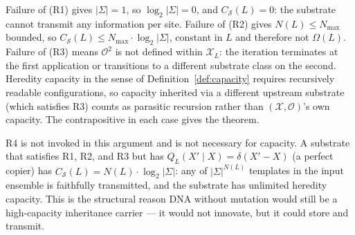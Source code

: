 \documentclass[aps,prx,reprint,amsmath,amssymb,floatfix,superscriptaddress,nofootinbib]{revtex4-2}
\theoremstyle{plain-thm}
\theoremstyle{definition-thm}
\newcommand{\Csub}{C_{\mathcal{S}}}
\newcommand{\Xset}{\mathcal{X}}
\newcommand{\Op}{\mathcal{O}}
\begin{document}
Failure of (R1) gives $|\Sigma| = 1$, so $\log_2 |\Sigma| = 0$, and $\Csub(L) = 0$: the substrate cannot transmit any information per site. Failure of (R2) gives $N(L) \le N_{\max}$ bounded, so $\Csub(L) \le N_{\max} \cdot \log_2 |\Sigma|$, constant in $L$ and therefore not $\Omega(L)$. Failure of (R3) means $\Op^2$ is not defined within $\Xset_L$: the iteration terminates at the first application or transitions to a different substrate class on the second. Heredity capacity in the sense of Definition~\ref{def:capacity} requires recursively readable configurations, so capacity inherited via a different upstream substrate (which satisfies R3) counts as parasitic recursion rather than $(\Xset, \Op)$'s own capacity. The contrapositive in each case gives the theorem.

R4 is not invoked in this argument and is not necessary for capacity. A substrate that satisfies R1, R2, and R3 but has $Q_L(X' \mid X) = \delta(X' - X)$ (a perfect copier) has $\Csub(L) = N(L) \cdot \log_2 |\Sigma|$: any of $|\Sigma|^{N(L)}$ templates in the input ensemble is faithfully transmitted, and the substrate has unlimited heredity capacity. This is the structural reason DNA without mutation would still be a high-capacity inheritance carrier --- it would not innovate, but it could store and transmit.
\end{document}

